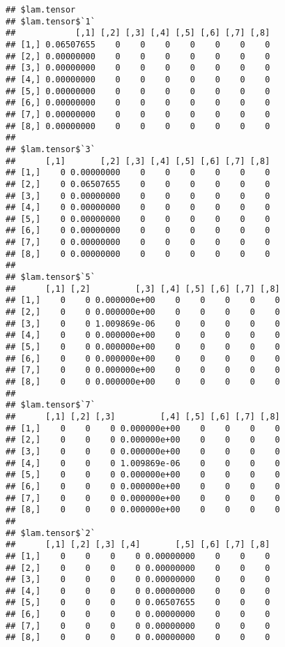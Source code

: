 \documentclass[
]{article}
\begin{document}
\begin{verbatim}
## $lam.tensor
## $lam.tensor$`1`
##            [,1] [,2] [,3] [,4] [,5] [,6] [,7] [,8]
## [1,] 0.06507655    0    0    0    0    0    0    0
## [2,] 0.00000000    0    0    0    0    0    0    0
## [3,] 0.00000000    0    0    0    0    0    0    0
## [4,] 0.00000000    0    0    0    0    0    0    0
## [5,] 0.00000000    0    0    0    0    0    0    0
## [6,] 0.00000000    0    0    0    0    0    0    0
## [7,] 0.00000000    0    0    0    0    0    0    0
## [8,] 0.00000000    0    0    0    0    0    0    0
## 
## $lam.tensor$`3`
##      [,1]       [,2] [,3] [,4] [,5] [,6] [,7] [,8]
## [1,]    0 0.00000000    0    0    0    0    0    0
## [2,]    0 0.06507655    0    0    0    0    0    0
## [3,]    0 0.00000000    0    0    0    0    0    0
## [4,]    0 0.00000000    0    0    0    0    0    0
## [5,]    0 0.00000000    0    0    0    0    0    0
## [6,]    0 0.00000000    0    0    0    0    0    0
## [7,]    0 0.00000000    0    0    0    0    0    0
## [8,]    0 0.00000000    0    0    0    0    0    0
## 
## $lam.tensor$`5`
##      [,1] [,2]         [,3] [,4] [,5] [,6] [,7] [,8]
## [1,]    0    0 0.000000e+00    0    0    0    0    0
## [2,]    0    0 0.000000e+00    0    0    0    0    0
## [3,]    0    0 1.009869e-06    0    0    0    0    0
## [4,]    0    0 0.000000e+00    0    0    0    0    0
## [5,]    0    0 0.000000e+00    0    0    0    0    0
## [6,]    0    0 0.000000e+00    0    0    0    0    0
## [7,]    0    0 0.000000e+00    0    0    0    0    0
## [8,]    0    0 0.000000e+00    0    0    0    0    0
## 
## $lam.tensor$`7`
##      [,1] [,2] [,3]         [,4] [,5] [,6] [,7] [,8]
## [1,]    0    0    0 0.000000e+00    0    0    0    0
## [2,]    0    0    0 0.000000e+00    0    0    0    0
## [3,]    0    0    0 0.000000e+00    0    0    0    0
## [4,]    0    0    0 1.009869e-06    0    0    0    0
## [5,]    0    0    0 0.000000e+00    0    0    0    0
## [6,]    0    0    0 0.000000e+00    0    0    0    0
## [7,]    0    0    0 0.000000e+00    0    0    0    0
## [8,]    0    0    0 0.000000e+00    0    0    0    0
## 
## $lam.tensor$`2`
##      [,1] [,2] [,3] [,4]       [,5] [,6] [,7] [,8]
## [1,]    0    0    0    0 0.00000000    0    0    0
## [2,]    0    0    0    0 0.00000000    0    0    0
## [3,]    0    0    0    0 0.00000000    0    0    0
## [4,]    0    0    0    0 0.00000000    0    0    0
## [5,]    0    0    0    0 0.06507655    0    0    0
## [6,]    0    0    0    0 0.00000000    0    0    0
## [7,]    0    0    0    0 0.00000000    0    0    0
## [8,]    0    0    0    0 0.00000000    0    0    0

\end{verbatim}
\end{document}
